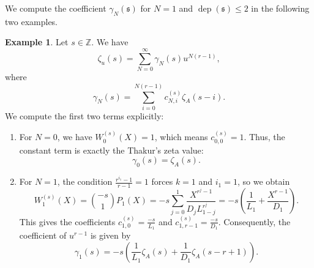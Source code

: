 \documentclass[12pt,reqno]{amsart}
\numberwithin{equation}{section}
\theoremstyle{plain}
\theoremstyle{definition}
\newtheorem{ex}[thm]{Example}
\theoremstyle{remark}
\newcommand{\ZZ}{\mathbb{Z}}
\newcommand{\dep}{\operatorname{dep}}
\newcommand{\ww}[1]{\mathfrak{#1}}
\begin{document}
We compute the coefficient $\gamma_N(\ww{s})$ for $N=1$ and $\dep(\ww{s}) \leq 2$ in the following two examples.
\begin{ex}\label{ex:expansion gamma}
Let $s\in\ZZ$. We have
$$\zeta_u(s) = \sum_{N=0}^{\infty} \gamma_N(s) u^{N(r-1)},$$
where 
$$\gamma_N(s) = \sum_{i=0}^{N(r-1)} c_{N,i}^{(s)} \zeta_A(s-i).$$
We compute the first two terms explicitly:
\begin{enumerate}
    \item For $N=0$, we have $W_0^{(s)}(X) = 1$, which means $c_{0,0}^{(s)} = 1$. Thus, the constant term is exactly the Thakur's zeta value:
    $$\gamma_0(s) = \zeta_A(s).$$
    
    \item For $N=1$, the condition $\frac{r^{i_1}-1}{r-1} = 1$ forces $k=1$ and $i_1=1$, so we obtain
    $$W_1^{(s)}(X) = \binom{-s}{1} P_1(X) = -s \sum_{j=0}^1 \frac{X^{r^j-1}}{D_j L_{1-j}^{r^j}} = -s \left( \frac{1}{L_1} + \frac{X^{r-1}}{D_1} \right).$$
    This gives the coefficients $c_{1,0}^{(s)} = \frac{-s}{L_1}$ and $c_{1,r-1}^{(s)} = \frac{-s}{D_1}$. Consequently, the coefficient of $u^{r-1}$ is given by
    $$\gamma_1(s) = -s \left( \frac{1}{L_1} \zeta_A(s) + \frac{1}{D_1} \zeta_A(s-r+1) \right).$$
\end{enumerate}
\end{ex}
\end{document}

